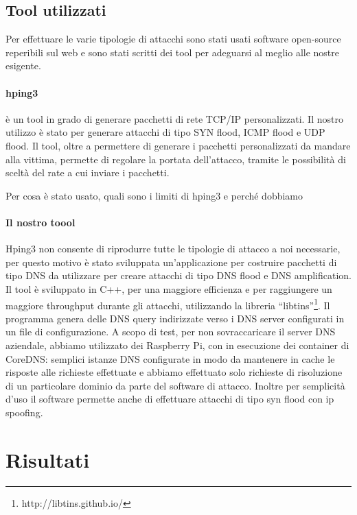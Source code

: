 \subsection{Tool utilizzati}

Per effettuare le varie tipologie di attacchi sono stati usati software open-source reperibili sul web e sono stati scritti dei tool per adeguarsi al meglio alle nostre esigente.

\paragraph{hping3} è un tool in grado di generare pacchetti di rete TCP/IP personalizzati. Il nostro utilizzo è stato per generare attacchi di tipo SYN flood, ICMP flood e UDP flood. Il tool, oltre a permettere di generare i pacchetti personalizzati da mandare alla vittima, permette di regolare la portata dell'attacco, tramite le possibilità di sceltà del rate a cui inviare i pacchetti.


Per cosa è stato usato, quali sono i limiti di hping3 e perché dobbiamo

\paragraph{Il nostro toool}

Hping3 non consente di riprodurre tutte le tipologie di attacco a noi necessarie, per questo motivo è stato sviluppata un'applicazione per costruire pacchetti di tipo DNS da utilizzare per creare attacchi di tipo DNS flood e DNS amplification.
Il tool è sviluppato in C++, per una maggiore efficienza e per raggiungere un maggiore throughput durante gli attacchi, utilizzando la libreria ``libtins''\footnote{ http://libtins.github.io/}.
Il programma genera delle DNS query indirizzate verso i DNS server configurati in un file di configurazione. A scopo di test, per non sovraccaricare il server DNS aziendale, abbiamo utilizzato dei Raspberry Pi, con in esecuzione dei container di CoreDNS: semplici istanze DNS configurate in modo da mantenere in cache le risposte alle richieste effettuate e abbiamo effettuato solo richieste di risoluzione di un particolare dominio da parte del software di attacco.
Inoltre per semplicità d'uso il software permette anche di effettuare attacchi di tipo syn flood con ip spoofing.


\section{Risultati}

